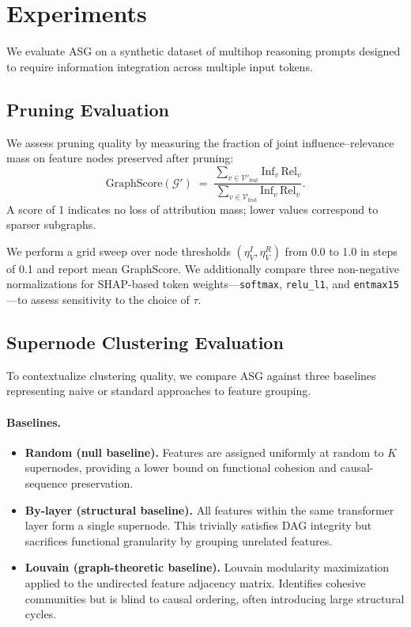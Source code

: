 \documentclass[11pt]{article}
\newcommand{\cV}{\mathcal{V}}
\newcommand{\cG}{\mathcal{G}}
\begin{document}
\section{Experiments}

We evaluate ASG on a synthetic dataset of multihop reasoning prompts designed to require information integration across multiple input tokens.

\subsection{Pruning Evaluation}

We assess pruning quality by measuring the fraction of joint influence--relevance mass on feature nodes preserved after pruning:
\[
  \mathrm{GraphScore}(\cG') \;=\; \frac{\sum_{v \in \cV'_{\mathrm{feat}}} \mathrm{Inf}_v\,\mathrm{Rel}_v}{\sum_{v \in \cV_{\mathrm{feat}}} \mathrm{Inf}_v\,\mathrm{Rel}_v}.
\]
A score of 1 indicates no loss of attribution mass; lower values correspond to sparser subgraphs.

We perform a grid sweep over node thresholds $(\eta_V^I, \eta_V^R)$ from 0.0 to 1.0 in steps of 0.1 and report mean GraphScore. We additionally compare three non-negative normalizations for SHAP-based token weights—\texttt{softmax}, \texttt{relu\_l1}, and \texttt{entmax15}—to assess sensitivity to the choice of $\tau$.

\subsection{Supernode Clustering Evaluation}

To contextualize clustering quality, we compare ASG against three baselines representing naive or standard approaches to feature grouping.

\paragraph{Baselines.}
\begin{itemize}
  \item \textbf{Random (null baseline).} Features are assigned uniformly at random to $K$ supernodes, providing a lower bound on functional cohesion and causal-sequence preservation.
  \item \textbf{By-layer (structural baseline).} All features within the same transformer layer form a single supernode. This trivially satisfies DAG integrity but sacrifices functional granularity by grouping unrelated features.
  \item \textbf{Louvain (graph-theoretic baseline).} Louvain modularity maximization applied to the undirected feature adjacency matrix. Identifies cohesive communities but is blind to causal ordering, often introducing large structural cycles.
\end{itemize}
\end{document}
